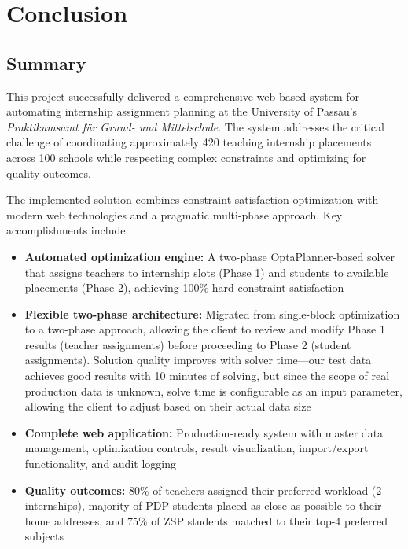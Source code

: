 \documentclass[12pt,a4paper]{report}
\begin{document}
\chapter{Conclusion}

\section{Summary}

This project successfully delivered a comprehensive web-based system for automating internship assignment planning at the University of Passau's \textit{Praktikumsamt für Grund- und Mittelschule}. The system addresses the critical challenge of coordinating approximately 420 teaching internship placements across 100 schools while respecting complex constraints and optimizing for quality outcomes.

The implemented solution combines constraint satisfaction optimization with modern web technologies and a pragmatic multi-phase approach. Key accomplishments include:

\begin{itemize}
    \item \textbf{Automated optimization engine:} A two-phase OptaPlanner-based solver that assigns teachers to internship slots (Phase 1) and students to available placements (Phase 2), achieving 100\% hard constraint satisfaction
    
    \item \textbf{Flexible two-phase architecture:} Migrated from single-block optimization to a two-phase approach, allowing the client to review and modify Phase 1 results (teacher assignments) before proceeding to Phase 2 (student assignments). Solution quality improves with solver time—our test data achieves good results with 10 minutes of solving, but since the scope of real production data is unknown, solve time is configurable as an input parameter, allowing the client to adjust based on their actual data size
    
    \item \textbf{Complete web application:} Production-ready system with master data management, optimization controls, result visualization, import/export functionality, and audit logging
    
    \item \textbf{Quality outcomes:} 80\% of teachers assigned their preferred workload (2 internships), majority of PDP students placed as close as possible to their home addresses, and 75\% of ZSP students matched to their top-4 preferred subjects
\end{itemize}
\end{document}
